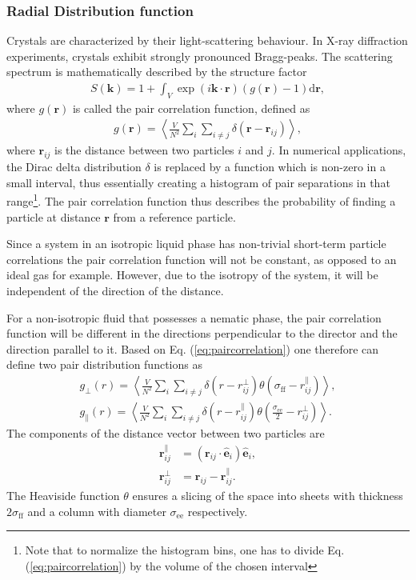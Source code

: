 \subsubsection{Radial Distribution function}
Crystals are characterized by their light-scattering behaviour. In X-ray diffraction experiments, crystals exhibit strongly pronounced Bragg-peaks. The scattering spectrum is mathematically described by the structure factor
\begin{align}
    S(\mathbf{k}) = 1 + \int_V \exp(i \mathbf{k\cdot r})(g(\mathbf{r})-1) \text{d}\mathbf{r},
\end{align}
where $g(\mathbf{r})$ is called the pair correlation function\cite{allen1987computer}, defined as
\begin{align}
\label{eq:paircorrelation}
    g(\mathbf{r}) = \left\langle\frac{V}{N^2} \displaystyle\sum_i\displaystyle\sum_{i\neq j} \delta(\mathbf{r}-\mathbf{r}_{ij})\right\rangle,
\end{align}
where $\mathbf{r}_{ij}$ is the distance between two particles $i$ and $j$. In numerical applications, the Dirac delta distribution $\delta$ is replaced by a function which is non-zero in a small interval, thus essentially creating a histogram of pair separations in that range\footnote{Note that to normalize the histogram bins, one has to divide Eq. (\ref{eq:paircorrelation}) by the volume of the chosen interval}. The pair correlation function thus describes the probability of finding a particle at distance $\mathbf{r}$ from a reference particle. 

Since a system in an isotropic liquid phase has non-trivial short-term particle correlations the pair correlation function will not be constant, as opposed to an ideal gas for example. However, due to the isotropy of the system, it will be independent of the direction of the distance.

For a non-isotropic fluid that possesses a nematic phase, the pair correlation function will be different in the directions perpendicular to the director and the direction parallel to it. Based on Eq. (\ref{eq:paircorrelation}) one therefore can define two pair distribution functions as 
\begin{align}
    g_{\perp}(r) = \left\langle \frac{V}{N^2} \displaystyle\sum_i\displaystyle\sum_{i\neq j} \delta(r-r_{ij}^\perp)\theta\left(\sigma_{\text{ff}}-r_{ij}^\parallel\right) \right\rangle, \\
    g_{\parallel}(r) = \left\langle \frac{V}{N^2} \displaystyle\sum_i\displaystyle\sum_{i\neq j} \delta(r-r_{ij}^\parallel)\theta\left(\frac{\sigma_{\text{ee}}}{2}-r_{ij}^\perp\right)\right\rangle.
\end{align}
The components of the distance vector between two particles are
\begin{align*}
    \mathbf{r}_{ij}^\parallel &= \left(\mathbf{r}_{ij}\cdot\hat{\mathbf{e}}_i\right)\hat{\mathbf{e}}_i,\\
    \mathbf{r}_{ij}^\perp &= \mathbf{r}_{ij} - \mathbf{r}_{ij}^\parallel.
\end{align*}
The Heaviside function $\theta$ ensures a slicing of the space into sheets with thickness $2\sigma_{\text{ff}}$ and a column with diameter $\sigma_{\text{ee}}$ respectively.

